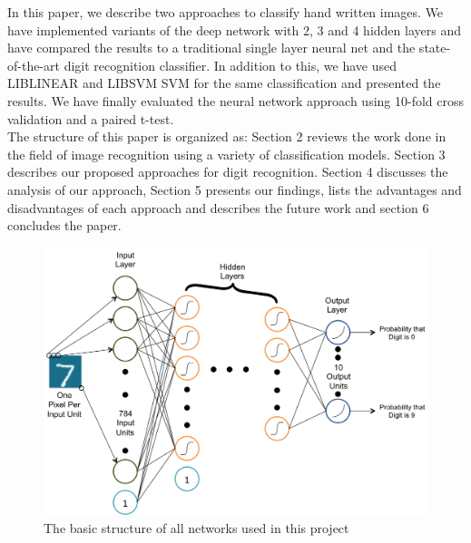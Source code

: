 \documentclass[10pt,twocolumn,letterpaper]{article}
\begin{document}
In this paper, we describe two approaches to classify hand written images. We have implemented variants of the deep network with 2, 3 and 4 hidden layers and have compared the results to a traditional single layer neural net and the state-of-the-art digit recognition classifier.  In addition to this, we have used LIBLINEAR \cite{REF08a} and LIBSVM \cite{CC01a} SVM for the same classification and presented the results. We have finally evaluated the neural network approach using 10-fold cross validation and a paired t-test.\\

The structure of this paper is organized as: Section 2 reviews the work done in the field of image recognition using a variety of classification models. Section 3 describes our proposed approaches for digit recognition. Section 4 discusses the analysis of our approach, Section 5 presents our findings, lists the advantages and disadvantages of each approach and describes the future work and section 6 concludes the paper.
\begin{figure}
\label{fig:structure}
\begin{center}
	\includegraphics[scale=0.7]{../images/Network.png}
\end{center}
   \caption{The basic structure of all networks used in this project}
\end{figure}
\end{document}

